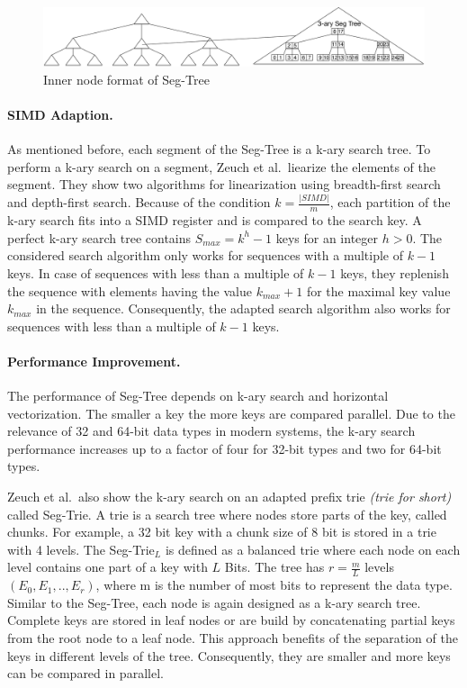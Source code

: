 \documentclass[runningheads,a4paper]{llncs}
\begin{document}
\begin{figure}
	\includegraphics[width=\textwidth]{SegTree}
	\caption{Inner node format of Seg-Tree}
	\label{seg}
\end{figure}

\paragraph{SIMD Adaption.}
As mentioned before, each segment of the Seg-Tree is a k-ary search tree. To perform a k-ary search on a segment, Zeuch et al.\ liearize the elements of the segment. They show two algorithms for linearization using breadth-first search and depth-first search. Because of the condition $k = \frac{\vert SIMD \vert }{m}$, each partition of the k-ary search fits into a SIMD register and is compared to the search key. A perfect k-ary search tree contains  $S_{max} = k^h - 1$ keys for an integer $h > 0$. The considered search algorithm only works for sequences with a multiple of $k-1$ keys. In case of  sequences with less than a multiple of $k-1$ keys, they replenish the sequence with elements having the value $k_{max} + 1$ for the maximal key value $k_{max}$ in the sequence. Consequently, the adapted search algorithm also works for sequences with less than a multiple of $k-1$ keys.

\paragraph{Performance Improvement.}
The performance of Seg-Tree depends on k-ary search and horizontal vectorization. The smaller a key the more keys are compared parallel. Due to the relevance of 32 and 64-bit data types in modern systems, the k-ary search performance increases up to a factor of four for 32-bit types and two for 64-bit types.

Zeuch et al.\ also show the k-ary search on an adapted prefix trie \emph{(trie for short)} called Seg-Trie. A trie is a search tree where nodes store parts of the key, called chunks. For example, a 32 bit key with a chunk size of 8 bit is stored in a trie with 4 levels. The Seg-Trie$_L$ is defined as a balanced trie where each node on each level contains one part of a key with $L$ Bits. The tree has $r = \frac{m}{L}$ levels $(E_0, E_1, .., E_r)$, where m is the number of most bits to represent the data type. 
Similar to the Seg-Tree, each node is again designed as a k-ary search tree. Complete keys are stored in leaf nodes or are build by concatenating partial keys from the root node to a leaf node. This approach benefits of the separation of the keys in different levels of the tree. Consequently, they are smaller and more keys can be compared in parallel. 
\end{document}
